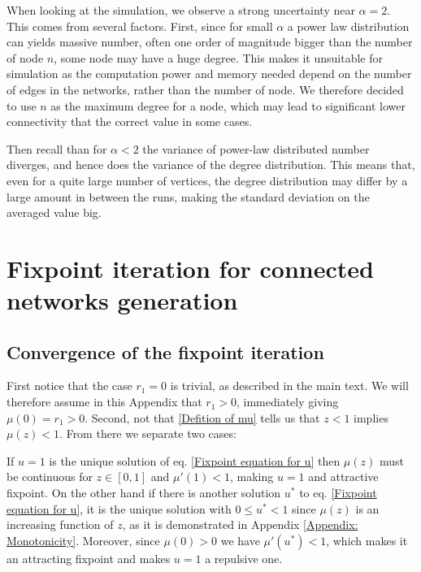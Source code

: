 \documentclass[
11pt, %
english, %
singlespacing, %
nolistspacing, %
liststotoc, %
headsepline, %
]{MastersDoctoralThesis} %
\begin{document}
When looking at the simulation, we observe a strong uncertainty near $\alpha = 2$. This comes from several factors. First, since for small $\alpha$ a power law distribution can yields massive number, often one order of magnitude bigger than the number of node $n$, some node may have a huge degree. This makes it unsuitable for simulation as the computation power and memory needed depend on the number of edges in the networks, rather than the number of node. We therefore decided to use $n$ as the maximum degree for a node, which may lead to significant lower connectivity that the correct value in some cases.

Then recall than for $\alpha < 2$ the variance of power-law distributed number diverges, and hence does the variance of the degree distribution. This means that, even for a quite large number of vertices, the degree distribution may differ by a large amount in between the runs, making the standard deviation on the averaged value big.


\appendix  %

\chapter{Fixpoint iteration for connected networks generation}
\section{Convergence of the fixpoint iteration}
\label{Appendix: Fixpoint convergence}

First notice that the case $r_1 = 0$ is trivial, as described in the main text. We will therefore assume in this Appendix that $r_1 > 0$, immediately giving $\mu(0) = r_1 > 0$. Second, not that \eqref{Defition of mu} tells us that $z < 1$ implies $\mu(z) < 1$. From there we separate two cases:

If $u = 1$ is the unique solution of eq. \eqref{Fixpoint equation for u} then $\mu(z)$ must be continuous for $z \in [0, 1]$ and $\mu'(1) < 1$, making $u = 1$ and attractive fixpoint. On the other hand if there is another solution $u^*$ to eq. \eqref{Fixpoint equation for u}, it is the unique solution with $0 \leq u^* < 1$ since $\mu(z)$ is an increasing function of $z$, as it is demonstrated in Appendix \ref{Appendix: Monotonicity}. Moreover, since $\mu(0) > 0$ we have $\mu'(u^*) < 1$, which makes it an attracting fixpoint and makes $u = 1$ a repulsive one.
\end{document}
